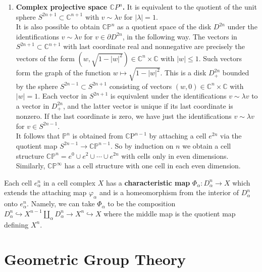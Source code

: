 \begin{example}
\begin{enumerate}
        \item \textbf{Complex projective space $\mathbb{C} P^n$.} It is equivalent to the quotient of the unit sphere $S^{2 n+1} \subset \mathbb{C}^{n+1}$ with $v \sim \lambda v$ for $|\lambda|=1$. \\
        It is also possible to obtain $\mathbb{C P}^n$ as a quotient space of the disk $D^{2 n}$ under the identifications $v \sim \lambda v$ for $v \in \partial D^{2 n}$, in the following way. The vectors in $S^{2 n+1} \subset \mathbb{C}^{n+1}$ with last coordinate real and nonnegative are precisely the vectors of the form $\left(w, \sqrt{1-|w|^2}\right) \in \mathbb{C}^n \times \mathbb{C}$ with $|w| \leq 1$. Such vectors form the graph of the function $w \mapsto \sqrt{1-|w|^2}$. This is a disk $D_{+}^{2 n}$ bounded by the sphere $S^{2 n-1} \subset S^{2 n+1}$ consisting of vectors $(w, 0) \in \mathbb{C}^n \times \mathbb{C}$ with $|w|=1$. Each vector in $S^{2 n+1}$ is equivalent under the identifications $v \sim \lambda v$ to a vector in $D_{+}^{2 n}$, and the latter vector is unique if its last coordinate is nonzero. If the last coordinate is zero, we have just the identifications $v \sim \lambda v$ for $v \in S^{2 n-1}$.\\
        It follows that $\mathbb{P}^n$ is obtained from $\mathbb{C} \mathrm{P}^{n-1}$ by attaching a cell $e^{2 n}$ via the quotient map $S^{2 n-1} \rightarrow \mathbb{C P}^{n-1}$. So by induction on $n$ we obtain a cell structure $\mathbb{C P}^n=e^0 \cup e^2 \cup \cdots \cup e^{2 n}$ with cells only in even dimensions. Similarly, $\mathbb{C P}^{\infty}$ has a cell structure with one cell in each even dimension.
    \end{enumerate}
\end{example}

Each cell $e_\alpha^n$ in a cell complex $X$ has a \textbf{characteristic map} $\Phi_\alpha: D_\alpha^n \rightarrow X$ which extends the attaching map $\varphi_\alpha$ and is a homeomorphism from the interior of $D_\alpha^n$ onto $e_\alpha^n$. Namely, we can take $\Phi_\alpha$ to be the composition $D_\alpha^n \hookrightarrow X^{n-1} \coprod_\alpha D_\alpha^n \rightarrow X^n \hookrightarrow X$ where the middle map is the quotient map defining $X^n$. 









\chapter{Geometric Group Theory}

